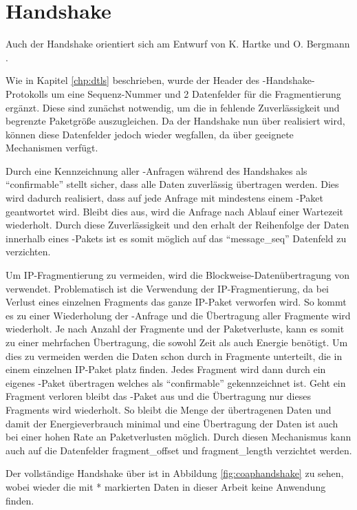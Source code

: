 \section{Handshake}

Auch der Handshake orientiert sich am Entwurf von K. Hartke und O. Bergmann \cite[Kapitel 4]{draftcodtls}.

Wie in Kapitel \ref{chp:dtls} beschrieben, wurde der Header des -Handshake-Protokolls um eine Sequenz-Nummer
und 2 Datenfelder für die Fragmentierung ergänzt. Diese sind zunächst notwendig, um die in  fehlende Zuverlässigkeit
und begrenzte Paketgröße auszugleichen. Da der Handshake nun über  realisiert wird, können diese Datenfelder jedoch
wieder wegfallen, da  über geeignete Mechanismen verfügt.

Durch eine Kennzeichnung aller -Anfragen während des Handshakes als "`confirmable"' stellt  sicher, dass
alle Daten zuverlässig übertragen werden. Dies wird dadurch realisiert, dass auf jede Anfrage mit mindestens einem -Paket
geantwortet wird. Bleibt dies aus, wird die Anfrage nach Ablauf einer Wartezeit wiederholt. Durch diese Zuverlässigkeit und den
erhalt der Reihenfolge der Daten innerhalb eines -Pakets ist es somit möglich auf das "`message\_seq"' Datenfeld zu verzichten.

Um IP-Fragmentierung zu vermeiden, wird die Blockweise-Datenübertragung von  verwendet. Problematisch ist die Verwendung
der IP-Fragmentierung, da bei Verlust eines einzelnen Fragments das ganze IP-Paket verworfen wird. So kommt es zu einer Wiederholung
der -Anfrage und die Übertragung aller Fragmente wird wiederholt. Je nach Anzahl der Fragmente und der Paketverluste, kann
es somit zu einer mehrfachen Übertragung, die sowohl Zeit als auch Energie benötigt. Um dies zu vermeiden werden die Daten schon
durch  in Fragmente unterteilt, die in einem einzelnen IP-Paket platz finden. Jedes Fragment wird dann durch ein eigenes
-Paket übertragen welches als "`confirmable"' gekennzeichnet ist. Geht ein Fragment verloren bleibt das -Paket aus
und die Übertragung nur dieses Fragments wird wiederholt. So bleibt die Menge der übertragenen Daten und damit der Energieverbrauch
minimal und eine Übertragung der Daten ist auch bei einer hohen Rate an Paketverlusten möglich. Durch diesen Mechanismus kann auch
auf die Datenfelder fragment\_offset und fragment\_length verzichtet werden.

Der vollständige Handshake über  ist in Abbildung \ref{fig:coaphandshake} zu sehen, wobei wieder die mit * markierten Daten
in dieser Arbeit keine Anwendung finden.

